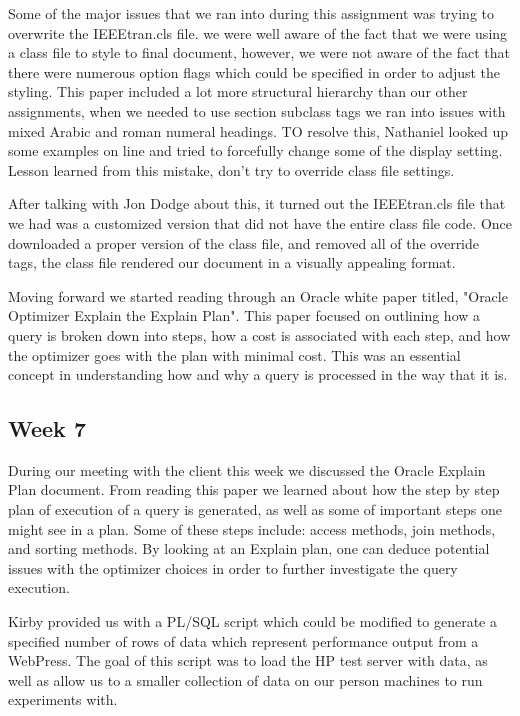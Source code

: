 \documentclass[draftclsnofoot, onecolumn, compsoc, 10pt]{IEEEtran}
\begin{document}
Some of the major issues that we ran into during this assignment was trying to overwrite the IEEEtran.cls file.
we were well aware of the fact that we were using a class file to style to final document, however, we were not aware of the fact that there were numerous option flags which could be specified in order to adjust the styling.
This paper included a lot more structural hierarchy than our other assignments, when we needed to use section subclass tags we ran into issues with mixed Arabic and roman numeral headings.
TO resolve this, Nathaniel looked up some examples on line and tried to forcefully change some of the display setting.
Lesson learned from this mistake, don't try to override class file settings.

After talking with Jon Dodge about this, it turned out the IEEEtran.cls file that we had was a customized version that did not have the entire class file code.
Once downloaded a proper version of the class file, and removed all of the override tags, the class file rendered our document in a visually appealing format.

Moving forward we started reading through an Oracle white paper titled, "Oracle Optimizer Explain the Explain Plan".
This paper focused on outlining how a query is broken down into steps, how a cost is associated with each step, and how the optimizer goes with the plan with minimal cost.
This was an essential concept in understanding how and why a query is processed in the way that it is.


\subsection{Week 7}
During our meeting with the client this week we discussed the Oracle Explain Plan document.
From reading this paper we learned about how the step by step plan of execution of a query is generated, as well as some of important steps one might see in a plan.
Some of these steps include: access methods, join methods, and sorting methods.
By looking at an Explain plan, one can deduce potential issues with the optimizer choices in order to further investigate the query execution.


Kirby provided us with a PL/SQL script which could be modified to generate a specified number of rows of data which represent performance output from a WebPress.
The goal of this script was to load the HP test server with data, as well as allow us to a smaller collection of data on our person machines to run experiments with.
\end{document}
